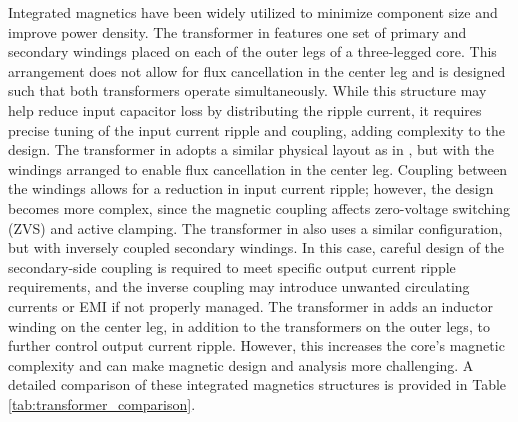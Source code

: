 \documentclass[lettersize,journal]{IEEEtran}
\begin{document}
Integrated magnetics have been widely utilized to minimize component size and improve power density. The transformer in \cite{ref15} features one set of primary and secondary windings placed on each of the outer legs of a three-legged core. This arrangement does not allow for flux cancellation in the center leg and is designed such that both transformers operate simultaneously. While this structure may help reduce input capacitor loss by distributing the ripple current, it requires precise tuning of the input current ripple and coupling, adding complexity to the design. The transformer in \cite{ref16} adopts a similar physical layout as in \cite{ref15}, but with the windings arranged to enable flux cancellation in the center leg. Coupling between the windings allows for a reduction in input current ripple; however, the design becomes more complex, since the magnetic coupling affects zero-voltage switching (ZVS) and active clamping. The transformer in \cite{ref17} also uses a similar configuration, but with inversely coupled secondary windings. In this case, careful design of the secondary-side coupling is required to meet specific output current ripple requirements, and the inverse coupling may introduce unwanted circulating currents or EMI if not properly managed. The transformer in \cite{ref18} adds an inductor winding on the center leg, in addition to the transformers on the outer legs, to further control output current ripple. However, this increases the core's magnetic complexity and can make magnetic design and analysis more challenging. A detailed comparison of these integrated magnetics structures is provided in Table \ref{tab:transformer_comparison}.
\end{document}
